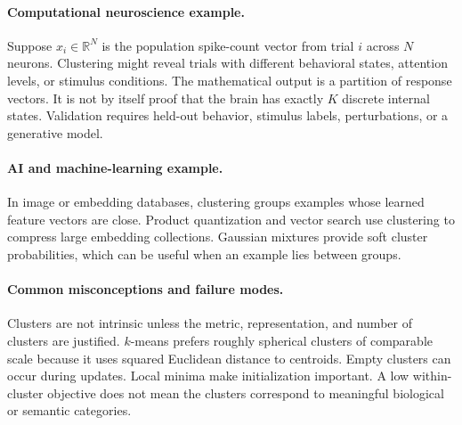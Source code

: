 \paragraph{Computational neuroscience example.}
Suppose \(x_i\in\mathbb R^N\) is the population spike-count vector from trial \(i\) across \(N\) neurons. Clustering might reveal trials with different behavioral states, attention levels, or stimulus conditions. The mathematical output is a partition of response vectors. It is not by itself proof that the brain has exactly \(K\) discrete internal states. Validation requires held-out behavior, stimulus labels, perturbations, or a generative model.

\paragraph{AI and machine-learning example.}
In image or embedding databases, clustering groups examples whose learned feature vectors are close. Product quantization and vector search use clustering to compress large embedding collections. Gaussian mixtures provide soft cluster probabilities, which can be useful when an example lies between groups.

\paragraph{Common misconceptions and failure modes.}
Clusters are not intrinsic unless the metric, representation, and number of clusters are justified. \(k\)-means prefers roughly spherical clusters of comparable scale because it uses squared Euclidean distance to centroids. Empty clusters can occur during updates. Local minima make initialization important. A low within-cluster objective does not mean the clusters correspond to meaningful biological or semantic categories.

